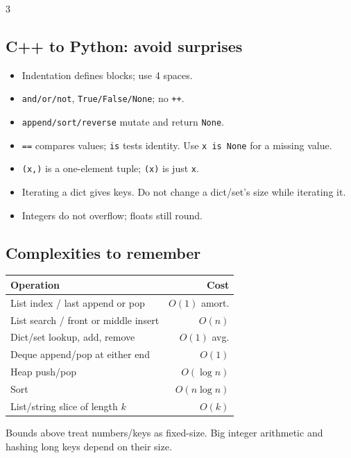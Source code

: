 \documentclass[9pt]{extarticle}
\let\referenceSubsection\subsection
\renewcommand{\subsection}{\needspace{4\baselineskip}\referenceSubsection}
\newcommand{\hint}[1]{{\small #1\par}}
\newcommand{\sheetstyle}{%
  \fontsize{9}{10}\selectfont
  \setlength{\parskip}{1pt}%
  \setlength{\multicolsep}{3pt}%
  \setlength{\abovedisplayskip}{3pt}%
  \setlength{\belowdisplayskip}{3pt}%
  \setlength{\abovedisplayshortskip}{1pt}%
  \setlength{\belowdisplayshortskip}{2pt}%
  \setlength{\jot}{1pt}}
\begin{document}
\begin{multicols*}{3}
\subsection{C++ to Python: avoid surprises}
\begin{itemize}
\item Indentation defines blocks; use 4 spaces.
\item \texttt{and/or/not}, \texttt{True/False/None}; no \texttt{++}.
\item \texttt{append/sort/reverse} mutate and return \texttt{None}.
\item \texttt{==} compares values; \texttt{is} tests identity.
      Use \texttt{x is None} for a missing value.
\item \texttt{(x,)} is a one-element tuple; \texttt{(x)} is just \texttt{x}.
\item Iterating a dict gives keys. Do not change a dict/set's size
      while iterating it.
\item Integers do not overflow; floats still round.
\end{itemize}

\subsection{Complexities to remember}\label{py:complexities}
\small
\begin{tabularx}{\linewidth}{@{}Xr@{}}
\toprule
Operation & Cost\\
\midrule
List index / last append or pop & $O(1)$ amort.\\
List search / front or middle insert & $O(n)$\\
Dict/set lookup, add, remove & $O(1)$ avg.\\
Deque append/pop at either end & $O(1)$\\
Heap push/pop & $O(\log n)$\\
Sort & $O(n\log n)$\\
List/string slice of length $k$ & $O(k)$\\
\bottomrule
\end{tabularx}
\normalsize
\hint{Bounds above treat numbers/keys as fixed-size.
Big integer arithmetic and hashing long keys depend on their size.}

\par
\begingroup\sheetstyle



\par\endgroup
\end{multicols*}
\end{document}
